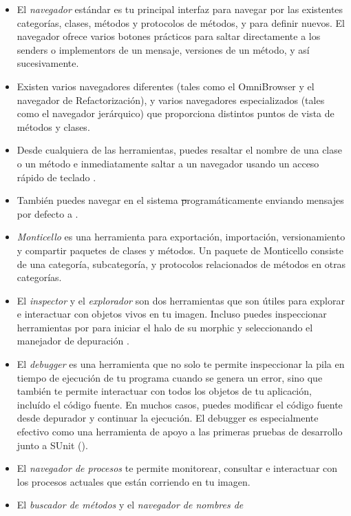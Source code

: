 \documentclass[spanish,a4paper,10pt,twoside]{book}
\begin{document}
\begin{itemize}
  \item El \emph{navegador} est\'andar es tu principal interfaz para navegar por las existentes categor\'ias, clases, m\'etodos y protocolos de m\'etodos, y para definir nuevos.
      El navegador ofrece varios botones pr\'acticos para saltar directamente a los senders o implementors de un mensaje, versiones de un m\'etodo, y as\'i sucesivamente.
  \item Existen varios navegadores diferentes (tales como el OmniBrowser y el
  navegador de Refactorizaci\'on), y varios navegadores especializados (tales como el navegador jer\'arquico) que proporciona distintos puntos de vista de m\'etodos y clases.
  \item Desde cualquiera de las herramientas, puedes resaltar el nombre de una clase o un m\'etodo e inmediatamente saltar a un navegador usando un acceso r\'apido de teclado .
  \item Tambi\'en puedes navegar en el sistema \st program\'aticamente enviando mensajes por defecto a .
  \item \emph{Monticello} es una herramienta para exportaci\'on, importaci\'on, versionamiento y compartir paquetes de clases y m\'etodos.
      Un paquete de Monticello consiste de una categor\'ia, subcategor\'ia, y
      protocolos relacionados de m\'etodos en otras categor\'ias.
  \item El \emph{inspector} y el \emph{explorador} son dos herramientas que son \'utiles para explorar e interactuar con objetos vivos en tu imagen.
      Incluso puedes inspeccionar herramientas por  para iniciar
      el halo de su morphic y seleccionando el manejador de depuraci\'on \debugHandle.
  \item El \emph{debugger} es una herramienta que no solo te permite
  inspeccionar la pila en tiempo de ejecuci\'on de tu programa cuando se genera
  un error, sino que tambi\'en te permite interactuar con todos los objetos de
  tu aplicaci\'on, inclu\'ido el c\'odigo fuente. En muchos casos, puedes
  modificar el c\'odigo fuente desde depurador y continuar la ejecuci\'on. El
  debugger es especialmente efectivo como una herramienta de apoyo a las primeras pruebas de desarrollo junto a SUnit ().
  \item El \emph{navegador de procesos} te permite monitorear, consultar e interactuar con los procesos actuales que est\'an corriendo en tu imagen.
  \item El \emph{buscador de m\'etodos} y el \emph{navegador de nombres de
}
\end{itemize}
\end{document}
